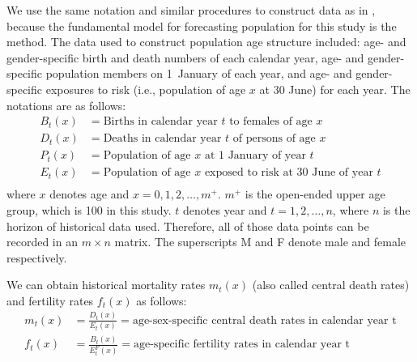 \documentclass[11pt,a4paper,]{article}
\begin{document}
We use the same notation and similar procedures to construct data as in \textcite{HB08}, because the fundamental model for forecasting population for this study is the \textcite{HU07} method. The data used to construct population age structure included: age- and gender-specific birth and death numbers of each calendar year, age- and gender-specific population members on 1~January of each year, and age- and gender-specific exposures to risk (i.e., population of age \(x\) at 30 June) for each year. The notations are as follows:
\vspace{-.4in}
\begin{align*}
  B_t(x) &= \text{Births in calendar year $t$ to females of age $x$}\\
  D_t(x) &= \text{Deaths in calendar year $t$ of persons of age $x$}\\
  P_t(x) &= \text{Population of age $x$ at 1 January of year $t$}\\
  E_t(x) &= \text{Population of age $x$ exposed to risk at 30 June of year $t$}\\
\end{align*}
\vspace{-.4in}where \(x\) denotes age and \(x=0,1,2,\dots,m^+\). \(m^+\) is the open-ended upper age group, which is 100 in this study. \(t\) denotes year and \(t=1,2,\dots,n\), where \(n\) is the horizon of historical data used. Therefore, all of those data points can be recorded in an \(m\times n\) matrix. The superscripts M and F denote male and female respectively.

We can obtain historical mortality rates \(m_t(x)\) (also called central death rates) and fertility rates \(f_t(x)\) as follows:
\vspace{-.3in}
\begin{align*}
  m_t(x) & = \frac{D_t(x)}{E_t(x)}=\text{age-sex-specific central death rates in calendar year t}\\
  f_t(x) & = \frac{B_t(x)}{E^F_t(x)}=\text{age-specific fertility rates in calendar year t}
\end{align*}
\end{document}
